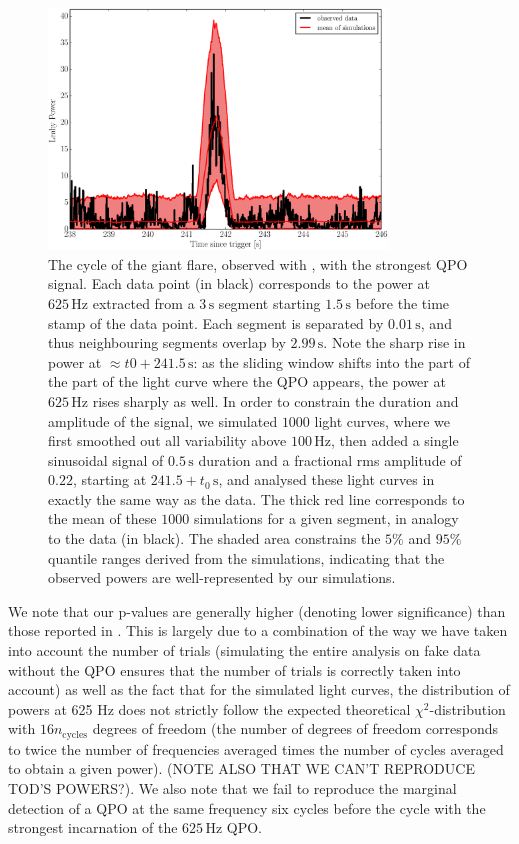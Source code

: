 \documentclass{emulateapj}
\begin{document}
\begin{figure}[htbp]
\begin{center}
\includegraphics[width=9cm]{f3.eps}
\caption{The cycle of the giant flare, observed with \rxte, with the strongest QPO signal. Each data point (in black) corresponds to the power at $625 \,\mathrm{Hz}$ extracted from a $3\,\mathrm{s}$ segment starting $1.5\,\mathrm{s}$ before the time stamp of the data point. Each segment is separated by $0.01\,\mathrm{s}$, and thus neighbouring segments overlap by $2.99 \,\mathrm{s}$. Note the sharp rise in power at $\approx t0+ 241.5\,\mathrm{s}$: as the sliding window shifts into the part of the part of the light curve where the QPO appears, the power at $625\,\mathrm{Hz}$ rises sharply as well. In order to constrain the duration and amplitude of the signal, we simulated $1000$ light curves, where we first smoothed out all variability above $100\,\mathrm{Hz}$, then added a single sinusoidal signal of $0.5\,\mathrm{s}$ duration and a fractional rms amplitude of $0.22$, starting at $241.5 +t_0\,\mathrm{s}$, and analysed these light curves in exactly the same way as the data. The thick red line corresponds to the mean of these $1000$ simulations for a given segment, in analogy to the data (in black). The shaded area constrains the $5\%$ and $95\%$ quantile ranges derived from the simulations, indicating that the observed powers are well-represented by our simulations.}
\label{fig:rxte_sims}
\end{center}
\end{figure}

We note that our p-values are generally higher (denoting lower significance) than those reported in \citet{Strohmayer06}. This is largely due to a combination of the way we have taken into account the number of trials (simulating the entire analysis on fake data without the QPO ensures that the number of trials is correctly taken into account) as well as the fact that for the simulated light curves, the distribution of powers at 625 Hz does not strictly follow the expected theoretical $\chi^2$-distribution with $16n_{\mathrm{cycles}}$ degrees of freedom (the number of degrees of freedom corresponds to twice the number of frequencies averaged times the number of cycles averaged to obtain a given power). (NOTE ALSO THAT WE CAN'T REPRODUCE TOD'S POWERS?).
We also note that we fail to reproduce the marginal detection of a QPO at the same frequency six cycles before the cycle with the strongest incarnation of the $625\, \mathrm{Hz}$ QPO. 
\end{document}
